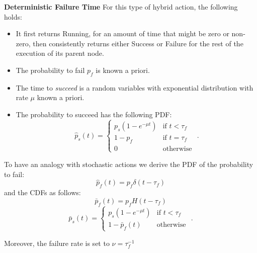 \textbf{Deterministic Failure Time}
For this type of hybrid action, the following holds:    
\begin{itemize}
\item It first returns Running, for an amount of time that might be zero or non-zero, then consistently returns either Success or Failure for the rest of the execution of its parent node.
\item The probability to fail $p_f$ is known a priori.
\item The time to \emph{succeed} is a random variables with exponential distribution with rate $\mu$ known a priori. 
\item The probability to succeed has the following PDF:
\begin{equation}
\hat p_s(t)=\begin{cases} p_s (1- e^{-\mu t}) &\mbox{if } t < \tau_f \\ 
1-p_f &\mbox{if } t = \tau_f \\
0 & \mbox{otherwise } 
 \end{cases}.
\end{equation}
\end{itemize}
To have an analogy with stochastic actions we derive the PDF of the probability to fail:
\begin{equation}
\hat p_f(t) = p_f  \delta(t-\tau_f)  
\end{equation}
and the CDFs as follows:
\begin{equation}
\bar p_f(t) = p_f  H(t-\tau_f)  
\end{equation}
\begin{equation}
\bar p_s(t)=\begin{cases} p_s (1- e^{-\mu t}) &\mbox{if } t < \tau_f \\ 
1 - \bar p_f(t)& \mbox{otherwise }  \end{cases}.
\end{equation}


Moreover, the failure rate is set to $\nu=\tau_f^{-1}$

